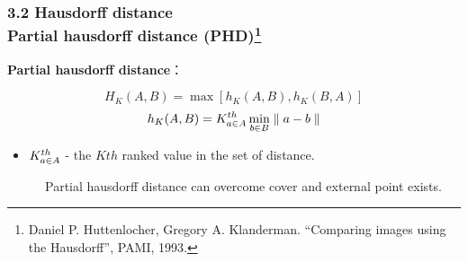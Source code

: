 \documentclass[notheorems,serif,table,compress]{beamer}  %
\begin{document}

\begin{frame}
\frametitle{3.2 Hausdorff distance \\ \normalsize{Partial hausdorff distance (PHD)\footnote{Daniel P. Huttenlocher, Gregory A. Klanderman. ``Comparing images using the Hausdorff'', PAMI, 1993.}}}%
{\color{blue}\textbf{Partial hausdorff distance}}：
\begin{tcolorbox}[colback=red!5,colframe=blue!75!black]
\begin{displaymath}
H_{K}(A,B)=\max[h_{K}(A,B),h_{K}(B,A)]
\end{displaymath}
\begin{displaymath}
h_{K}(A,B)=K^{th}_{\begin{subarray}{l}
              a\in A
               \end{subarray}}
\min_{\begin{subarray}{l}
              b\in B
               \end{subarray}}
        \parallel a-b \parallel
\end{displaymath}
\begin{itemize}
    \item $K^{th}_{\begin{subarray}{l}a\in A\end{subarray}}$ - the $Kth$ ranked value in the set of distance.\newline
\end{itemize}
\end{tcolorbox}

~~~~~~Partial hausdorff distance can overcome cover and external point exists.
\end{frame}

 
\end{document}
